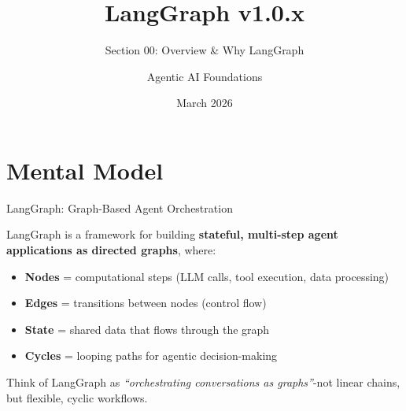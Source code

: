 \documentclass[aspectratio=169,11pt]{beamer}
\title{LangGraph v1.0.x}
\subtitle{Section 00: Overview \& Why LangGraph}
\author{Agentic AI Foundations}
\date{March 2026}
\begin{document}
\begin{frame}
\titlepage
\end{frame}

\section{Mental Model}
\begin{frame}[t]{LangGraph: Graph-Based Agent Orchestration}
\setlength{\itemsep}{1pt}
\vspace{0.1cm}
\begin{conceptbox}
LangGraph is a framework for building \textbf{stateful, multi-step agent applications as directed graphs}, where:
\setlength{\itemsep}{1pt}
\begin{itemize}
  \item \textbf{Nodes} = computational steps (LLM calls, tool execution, data processing)
  \item \textbf{Edges} = transitions between nodes (control flow)
  \item \textbf{State} = shared data that flows through the graph
  \item \textbf{Cycles} = looping paths for agentic decision-making
\end{itemize}
\end{conceptbox}

\vspace{0.15cm}

Think of LangGraph as \textit{``orchestrating conversations as graphs''}-not linear chains, but flexible, cyclic workflows.
\end{frame}
\end{document}
